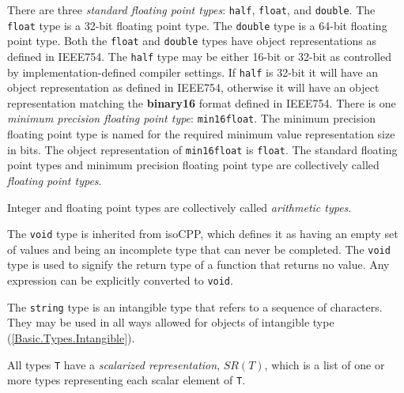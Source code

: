 \p There are three \textit{standard floating point types}: \texttt{half},
\texttt{float}, and \texttt{double}. The \texttt{float} type is a 32-bit
floating point type. The \texttt{double} type is a 64-bit floating point type.
Both the \texttt{float} and \texttt{double} types have object representations as
defined in \gls{IEEE754}. The \texttt{half} type may be either 16-bit or 32-bit
as controlled by implementation-defined compiler settings. If \texttt{half} is
32-bit it will have an object representation as defined in \gls{IEEE754},
otherwise it will have an object representation matching the \textbf{binary16}
format defined in \gls{IEEE754}. There is one \textit{minimum precision floating
point type}: \texttt{min16float}. The minimum precision floating point type is
named for the required minimum value representation size in bits. The object
representation of \texttt{min16float} is \texttt{float}. The standard floating
point types and minimum precision floating point type are collectively called
\textit{floating point types}.

\p Integer and floating point types are collectively called \textit{arithmetic
types}.

\p The \texttt{void} type is inherited from \gls{isoCPP}, which defines it as
having an empty set of values and being an incomplete type that can never be
completed. The \texttt{void} type is used to signify the return type of a
function that returns no value. Any expression can be explicitly converted to
\texttt{void}.


\p The \texttt{string} type is an intangible type that refers to a sequence of
characters. They may be used in all ways allowed for objects of intangible type
(\ref{Basic.Types.Intangible}).


\p All types \texttt{T} have a \textit{scalarized representation}, \(SR(T)\),
which is a list of one or more types representing each scalar element of
\texttt{T}.

